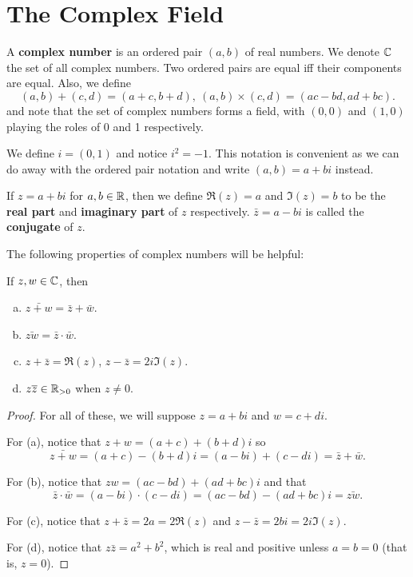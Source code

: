 \section{The Complex Field}
\begin{definition}
A \textbf{complex number} is an ordered pair $(a, b)$ of real numbers. We denote $\mathbb{C}$ the set of all complex numbers. Two ordered pairs are equal iff their components are equal. Also, we define
\[
	(a, b) + (c, d) = (a + c, b + d),\ (a, b) \times (c, d) = (ac - bd, ad + bc).
\]
and note that the set of complex numbers forms a field, with $(0, 0)$ and $(1, 0)$ playing the roles of 0 and 1 respectively.

We define $i = (0, 1)$ and notice $i^2 = -1$. This notation is convenient as we can do away with the ordered pair notation and write $(a, b) = a + bi$ instead.

If $z = a + bi$ for $a, b \in \mathbb{R}$, then we define $\Re(z) = a$ and $\Im(z) = b$ to be the \textbf{real part} and \textbf{imaginary part} of $z$ respectively. $\bar{z} = a - bi$ is called the \textbf{conjugate} of $z$. 
\end{definition}

The following properties of complex numbers will be helpful:
\begin{theorem}
If $z, w \in \mathbb{C}$, then 
\begin{enumerate}[(a)]
\item $\bar{z + w} = \bar{z} + \bar{w}$.
\item $\bar{zw} = \bar{z} \cdot \bar{w}$.
\item $z + \bar{z} = \Re(z)$, $z - \bar{z} = 2i\Im(z)$.
\item $z\overline{z} \in \mathbb{R}_{>0}$ when $z \ne 0$.
\end{enumerate}
\begin{proof}
For all of these, we will suppose $z = a + bi$ and $w = c + di$.

For (a), notice that $z + w = (a + c) + (b + d)i$ so
\[
	\bar{z + w} = (a + c) - (b + d)i = (a - bi) + (c - di) = \bar{z} + \bar{w}.
\]

For (b), notice that $zw = (ac - bd) + (ad + bc)i$ and that
\[
	\bar{z} \cdot \bar{w} = (a - bi) \cdot (c - di) = (ac - bd) - (ad + bc)i = \bar{zw}.
\]

For (c), notice that $z + \bar{z} = 2a = 2\Re(z)$ and $z - \bar{z} = 2bi = 2i\Im(z)$.

For (d), notice that $z\bar{z} = a^2 + b^2$, which is real and positive unless $a = b = 0$ (that is, $z = 0$).
\end{proof}
\end{theorem}

